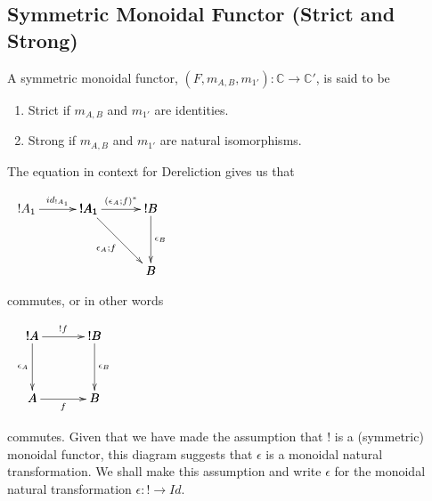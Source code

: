 \subsection{Symmetric Monoidal Functor (Strict and Strong)}
\label{subsec:symmetric_monoidal_functor_s_and_s}
\begin{definition}
    A symmetric monoidal functor, $(F,m_{A,B},m_{1'}): \mathbb{C} \rightarrow \mathbb{C}'$, is said to be
    \begin{enumerate}
        \item Strict if $m_{A,B}$ and $m_{1'}$ are identities.
        \item Strong if $m_{A,B}$ and $m_{1'}$ are natural isomorphisms.
    \end{enumerate}
    The equation in context for Dereliction gives us that
    \begin{center}
        \begin{math}
            \begin{array}{c}
                \bfig
                \morphism(0,500)|a|<500,0>[!A_1`!A_1;id_{!A_1}]
                \qtriangle(500,0)|alr|<500,500>[
                    !A_1`
                    !B`
                    B;
                    (\epsilon_A;f)^*`
                    \epsilon_A;f`
                    \epsilon_B
                ]
                \efig
            \end{array}
        \end{math}
    \end{center}
    commutes, or in other words
    \begin{center}
        \begin{math}
            \begin{array}{c}
                \bfig
                \square[!A`!B`A`B;!f`\epsilon_A`\epsilon_B`f]
                \efig
            \end{array}
        \end{math}
    \end{center}
    commutes.  Given that we have made the assumption that ! is a (symmetric) monoidal functor, this diagram suggests
    that $\epsilon$ is a monoidal natural transformation.  We shall make this assumption and write $\epsilon$ for the monoidal 
    natural transformation $\epsilon:! \rightarrow Id$.  
\end{definition}